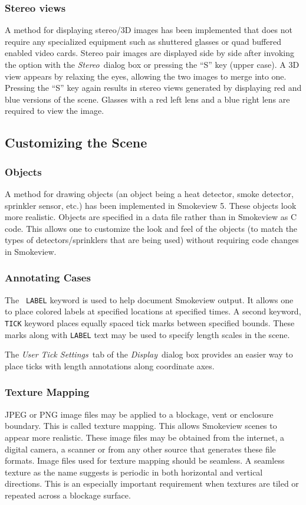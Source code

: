 \documentclass[11pt,twoside]{book}
\begin{document}
\subsubsection{Stereo views}A method for displaying stereo/3D images has been implemented that does
not require any specialized equipment such as shuttered glasses or quad buffered enabled video cards.  Stereo pair images are displayed side by side after invoking the option with
the {\em Stereo}\ dialog box or pressing the ``S'' key (upper case).  A 3D view appears by relaxing the eyes, allowing the two images to merge into one.
Pressing the ``S'' key again results in stereo views generated by displaying red and blue versions of the scene.  Glasses with a red left lens and a blue right lens are required to view the image.

\subsection{Customizing the Scene}

\subsubsection{Objects}A method for drawing objects (an object
being a heat detector, smoke detector, sprinkler sensor, etc.) has
been implemented in Smokeview 5.  These objects look more
realistic.  Objects are specified in a data file rather than in
Smokeview as C code. This allows one to customize the look and
feel of the objects (to match the types of detectors/sprinklers
that are being used) without requiring code changes in Smokeview.

\subsubsection{Annotating Cases}The {\tt
LABEL} keyword is used to help document Smokeview output.
It allows one to place colored labels at specified
locations at specified times.  A second keyword, {\tt TICK} keyword places
equally spaced tick marks between specified bounds. These marks
along with {\tt LABEL} text may be used to specify length scales
in the scene.

The {\em User Tick Settings}\ tab of the {\em Display}\ dialog box
provides an easier way to place ticks with length annotations
along coordinate axes.

\subsubsection{Texture Mapping} JPEG or PNG image files may be applied to a
blockage, vent or enclosure boundary. This is called texture
mapping.  This allows Smokeview scenes to appear more realistic.
These image files may be obtained from the internet, a digital
camera, a scanner or from any other source that generates these
file formats. Image files used for texture mapping should be
seamless. A seamless texture as the name suggests is periodic in
both horizontal and vertical directions. This is an especially
important requirement when textures are tiled or repeated across a
blockage surface.
\end{document}
